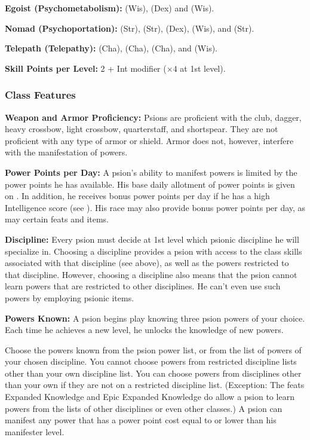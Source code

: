 \textbf{Egoist (Psychometabolism):}  (Wis),  (Dex) and  (Wis).

\textbf{Nomad (Psychoportation):}  (Str),  (Str),  (Dex),  (Wis), and  (Str).

\textbf{Telepath (Telepathy):}  (Cha),  (Cha),  (Cha), and  (Wis).

\textbf{Skill Points per Level:} 2 + Int modifier ($\times 4$ at 1st level).

\subsubsection{Class Features}

\textbf{Weapon and Armor Proficiency:} Psions are proficient with the club, dagger, heavy crossbow, light crossbow, quarterstaff, and shortspear. They are not proficient with any type of armor or shield. Armor does not, however, interfere with the manifestation of powers.

\textbf{Power Points per Day:} A psion's ability to manifest powers is limited by the power points he has available. His base daily allotment of power points is given on . In addition, he receives bonus power points per day if he has a high Intelligence score (see ). His race may also provide bonus power points per  day, as may certain feats and items.

\textbf{Discipline:} Every psion must decide at 1st level which psionic discipline he will specialize in. Choosing a discipline provides a psion with access to the class skills associated with that discipline (see above), as well as the powers restricted to that discipline. However, choosing a discipline also means that the psion cannot learn powers that are restricted to other disciplines. He can't even use such powers by employing psionic items.

\textbf{Powers Known:} A psion begins play knowing three psion powers of your choice. Each time he achieves a new level, he unlocks the knowledge of new powers.

Choose the powers known from the psion power list, or from the list of powers of your chosen discipline. You cannot choose powers from restricted discipline lists other than your own discipline list. You can choose powers from disciplines other than your own if they are not on a restricted discipline list. (Exception: The feats Expanded Knowledge and Epic Expanded Knowledge do allow a psion to learn powers from the lists of other disciplines or even other classes.) A psion can manifest any power that has a power point cost equal to or lower than his manifester level.

